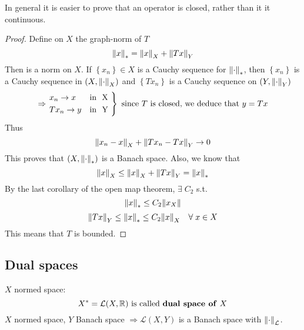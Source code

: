 \begin{remark}
    In general it is easier to prove that an operator is closed, rather than it it continuous.
\end{remark}
\begin{proof}
    Define on \(X\) the graph-norm of \(T\)
    \[
        \norm{x}_* = \norm{x}_X + \norm{Tx}_Y
    \]
    Then is a norm on \(X\). If \(\left\{ x_n \right\} \in X\) is a Cauchy sequence for \(\norm{\cdot}_*\), then \(\left\{ x_n \right\}\) is a Cauchy sequence in \((X, \norm{\cdot}_X)\) and \(\left\{ Tx_n \right\}\) is a Cauchy sequence on \((Y, \norm{\cdot}_Y)\)
    \[
        \Rightarrow \begin{rcases*}
            x_n \to x & \mbox{in } X \\
            Tx_n \to y & \mbox{in } Y
        \end{rcases*} \mbox{ since } T \mbox{ is closed, we deduce that } y = Tx
    \]
    Thus 
    \[
        \norm{x_n - x}_X + \norm{Tx_n - Tx}_Y \to 0
    \]
    This proves that \((X, \norm{\cdot}_*)\) is a Banach space. Also, we know that 
    \[
        \norm{x}_X \leq \norm{x}_X + \norm{Tx}_Y = \norm{x}_*
    \]
    By the last corollary of the open map theorem, \(\exists \; C_2\) s.t. 
    \[
        \norm{x}_* \leq C_2 \norm{x_X}
    \]
    \[
        \norm{Tx}_Y \leq \norm{x}_* \leq C_2 \norm{x}_X \quad \forall \; x \in X
    \]
    This means that \(T\) is bounded.
\end{proof}
\subsection*{Dual spaces}
\(X\) normed space: 
\[
    X^* = \mathcal{L}(X, \mathbb{R}) \mbox{ is called \textbf{dual space of} }X
\]
\(X\) normed space, \(Y\) Banach space \(\Rightarrow \mathcal{L}(X, Y)\) is a Banach space with \(\norm{\cdot}_{\mathcal{L}}\).

